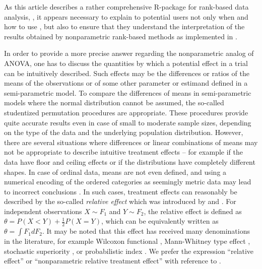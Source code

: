 As this article describes a rather comprehensive R-package for 
rank-based data analysis, , it appears necessary to explain to 
potential users not only when and how to use 
, but also to ensure that they understand the interpretation of 
the results obtained by nonparametric rank-based methods as implemented in 
.

In order to provide a more precise answer %
regarding the nonparametric analog of ANOVA, one has to discuss the quantities 
by which a potential effect in a trial can be intuitively described. Such 
effects may be the differences or ratios of the means of the observations or of 
some other parameter or estimand defined in a semi-parametric model. To compare the 
differences of means in semi-parametric models where the normal distribution 
cannot be assumed, the so-called studentized permutation procedures 
\citep{janssen1997studentized,pauly2015asymptotic,smaga2015wald} are 
appropriate. These procedures provide quite accurate results even in case of 
small to moderate sample sizes, depending on the type of the data 
and the underlying population distribution. However, there are several 
situations where differences or linear combinations of means may not be 
appropriate to describe intuitive treatment effects -- for example if the data 
have floor and ceiling effects or if the distributions have completely 
different shapes. In case of ordinal data, means are not even defined, and 
using a numerical encoding of the ordered categories as seemingly metric data 
may lead to incorrect conclusions \citep{kahler2008parametric}. In such cases, 
treatment effects can reasonably be described by the so-called 
{\it relative effect} which was introduced by \cite{mann1947test} and 
\cite{putter1955treatment}. For independent observations $X \sim F_1$ and $Y 
\sim F_2$, the relative effect is defined as $\theta = P(X<Y)+\frac12 P(X=Y)$, 
which can be equivalently written as $\theta = \int F_1 dF_2$. It may be noted 
that this effect has received many denominations in the literature, for example 
Wilcoxon functional \citep{janssen1999nonparametric}, Mann-Whitney type effect 
\citep{dobler2019nonparametric}, stochastic superiority \citep{d2006mann}, or 
probabilistic index \citep{acion2006probabilistic, thas2012probabilistic}. We 
prefer the expression ``relative effect'' or ``nonparametric relative treatment 
effect'' with reference to \cite{birnbaum1957bounds}.

